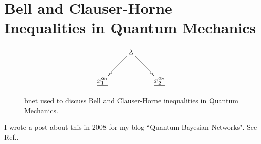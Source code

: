 \chapter{Bell  
and Clauser-Horne Inequalities 
in Quantum Mechanics}

\begin{figure}[h!]
\centering
$$\xymatrix{
&\ul{\lambda}\ar[dr]\ar[dl]&\\
\ul{x_1^{\alpha_1}}&&\ul{x_2^{\alpha_2}}
}$$
\caption{bnet used to discuss Bell 
and Clauser-Horne inequalities 
in Quantum Mechanics.}
\label{fig-monty}
\end{figure}

I wrote a post about
this in 2008 for
my blog ``Quantum Bayesian Networks". See Ref.\cite{bell-blog}.
